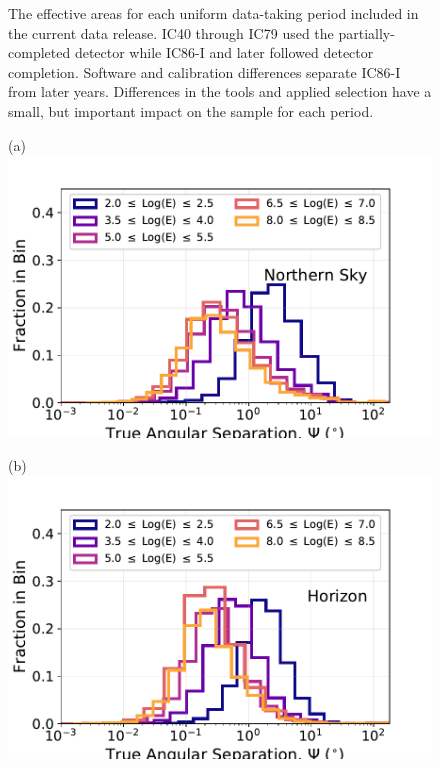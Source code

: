 \documentclass[aps,10pt,prd,twocolumn,floats,letterpaper,showpacs,nofootinbib,bibnotes,notitlepage,superscriptaddress,floatfix]{revtex4-1}
\begin{document}
\begin{figure}[t]
\begin{minipage}[c][6.5cm][c]{0.49\textwidth}
\end{minipage}

\caption{The effective areas for each uniform data-taking period included in the current data release. IC40 through IC79 used the partially-completed detector while IC86-I and later followed detector completion. Software and calibration differences separate IC86-I from later years. Differences in the tools and applied selection have a small, but important impact on the sample for each period.}\label{fig:effA}
\end{figure}

\begin{figure}[t]\centering
\begin{minipage}[c][3.5cm][c]{0.30\textwidth}\centering
{(a)}\\\includegraphics[width=\linewidth]{./PublicReleasePlots/ReconstructionPlots/IC86-II/IC86_II_MC_psf_2.pdf}
\end{minipage}
\begin{minipage}[c][3.5cm][c]{0.30\textwidth}\centering
{(b)}\\\includegraphics[width=\linewidth]{./PublicReleasePlots/ReconstructionPlots/IC86-II/IC86_II_MC_psf_1.pdf}

\end{minipage}
\end{figure}
\end{document}
